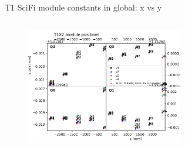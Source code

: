 \documentclass[aspectratio=1610, 12pt]{beamer}
\begin{document}
\begin{frame}{T1 SciFi module constants in global: x vs y}
\begin{columns}
\begin{column}[c]{0.5\textwidth}
\begin{figure}
        \includegraphics[width=0.61\textwidth]{plots/out_x_y_pos/retest_x_vs_zT1X2.pdf}
      \end{figure}
    \end{column}
  \end{columns}
\end{frame}
\end{document}
